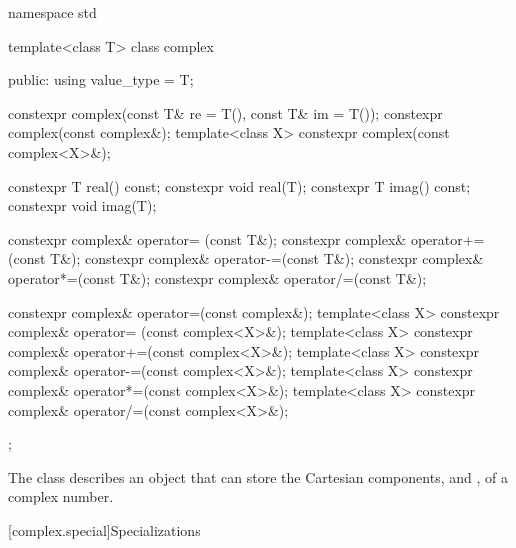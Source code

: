%
%
\begin{codeblock}
namespace std {
  template<class T> class complex {
  public:
    using value_type = T;

    constexpr complex(const T& re = T(), const T& im = T());
    constexpr complex(const complex&);
    template<class X> constexpr complex(const complex<X>&);

    constexpr T real() const;
    constexpr void real(T);
    constexpr T imag() const;
    constexpr void imag(T);

    constexpr complex& operator= (const T&);
    constexpr complex& operator+=(const T&);
    constexpr complex& operator-=(const T&);
    constexpr complex& operator*=(const T&);
    constexpr complex& operator/=(const T&);

    constexpr complex& operator=(const complex&);
    template<class X> constexpr complex& operator= (const complex<X>&);
    template<class X> constexpr complex& operator+=(const complex<X>&);
    template<class X> constexpr complex& operator-=(const complex<X>&);
    template<class X> constexpr complex& operator*=(const complex<X>&);
    template<class X> constexpr complex& operator/=(const complex<X>&);
  };
}
\end{codeblock}

\pnum
The class
describes an object that can
store the Cartesian components,
and
,
of a complex
number.

[complex.special]{Specializations}


